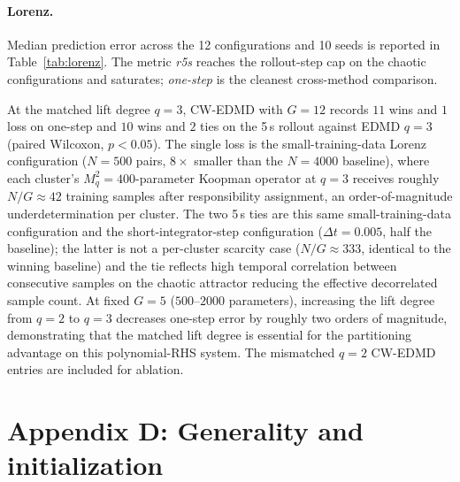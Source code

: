 \documentclass{article}
\begin{document}
\paragraph{Lorenz.} Median prediction error across the 12 configurations and 10 seeds is reported in Table~\ref{tab:lorenz}. The metric \emph{r5s} reaches the rollout-step cap on the chaotic configurations and saturates; \emph{one-step} is the cleanest cross-method comparison.
\begin{table}[H]
\caption{Lorenz attractor: median prediction error (dimensionless state-space units) across 12 configurations and 10 seeds. Top block: EDMD at two polynomial lift degrees. Middle block: CW-EDMD at lift degree $q{=}2$ (mismatched). Bottom block: CW-EDMD at the matched lift degree $q{=}3$. Bold marks the column-wise minimum.}
\label{tab:lorenz}
\centering\small

\end{table}
\noindent At the matched lift degree $q{=}3$, CW-EDMD with $G{=}12$ records $11$ wins and $1$ loss on one-step and $10$ wins and $2$ ties on the 5\,s rollout against EDMD $q{=}3$ (paired Wilcoxon, $p < 0.05$). The single loss is the small-training-data Lorenz configuration ($N{=}500$ pairs, $8\times$ smaller than the $N{=}4000$ baseline), where each cluster's $M_q^2 = 400$-parameter Koopman operator at $q{=}3$ receives roughly $N/G \approx 42$ training samples after responsibility assignment, an order-of-magnitude underdetermination per cluster. The two 5\,s ties are this same small-training-data configuration and the short-integrator-step configuration ($\Delta t{=}0.005$, half the baseline); the latter is not a per-cluster scarcity case ($N/G \approx 333$, identical to the winning baseline) and the tie reflects high temporal correlation between consecutive samples on the chaotic attractor reducing the effective decorrelated sample count. At fixed $G{=}5$ ($500$--$2000$ parameters), increasing the lift degree from $q{=}2$ to $q{=}3$ decreases one-step error by roughly two orders of magnitude, demonstrating that the matched lift degree is essential for the partitioning advantage on this polynomial-RHS system. The mismatched $q{=}2$ CW-EDMD entries are included for ablation.


\section*{Appendix D: Generality and initialization}
\end{document}
